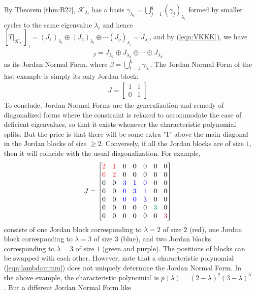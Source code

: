 By Theorem \ref{thm:B27}, $\mathcal{K}_{\lambda_i}$ has a basis $\gamma_{\lambda_i} = \bigcup_{j=1}^{q} (\gamma_j)_{\lambda_i}$ formed by smaller cycles to the same eigenvalue $\lambda_i$ and hence $[T|_{\mathcal{K}_{\lambda_i}}]_\gamma = {(J_1)}_{\lambda_i} \oplus {(J_2)}_{\lambda_i} \oplus \cdots {(J_q)}_{\lambda_i} = J_{\lambda_i}$, and by (\ref{eqn:VKKK}), we have
\begin{align}
[T]_\beta = J_{\lambda_1} \oplus J_{\lambda_2} \oplus \cdots \oplus J_{\lambda_k}
\end{align}
as its Jordan Normal Form, where $\beta = \bigcup_{i=1}^{k} \gamma_{\lambda_i}$. The Jordan Normal Form of the last example is simply its only Jordan block:
\begin{align*}
J = \begin{bmatrix}
1 & 1 \\
0 & 1
\end{bmatrix} 
\end{align*}
To conclude, Jordan Normal Forms are the generalization and remedy of diagonalized forms where the constraint is relaxed to accommodate the case of deficient eigenvalues, so that it exists whenever the characteristic polynomial splits. But the price is that there will be some extra "1" above the main diagonal in the Jordan blocks of size $\geq 2$. Conversely, if all the Jordan blocks are of size $1$, then it will coincide with the usual diagonalization. For example,
\begin{align*}
J = 
\begin{bmatrix}
\mathcolor{red}{2} & \mathcolor{red}{1} & 0 & 0 & 0 & 0 & 0 \\
\mathcolor{red}{0} & \mathcolor{red}{2} & 0 & 0 & 0 & 0 & 0 \\
0 & 0 & \mathcolor{blue}{3} & \mathcolor{blue}{1} & \mathcolor{blue}{0} & 0 & 0 \\
0 & 0 & \mathcolor{blue}{0} & \mathcolor{blue}{3} & \mathcolor{blue}{1} & 0 & 0 \\
0 & 0 & \mathcolor{blue}{0} & \mathcolor{blue}{0} & \mathcolor{blue}{3} & 0 & 0 \\
0 & 0 & 0 & 0 & 0 & \mathcolor{Green}{3} & 0 \\
0 & 0 & 0 & 0 & 0 & 0 & \mathcolor{purple}{3}
\end{bmatrix}
\end{align*}
consists of one Jordan block corresponding to $\lambda = 2$ of size $2$ (red), one Jordan block corresponding to $\lambda = 3$ of size $3$ (blue), and two Jordan blocks corresponding to $\lambda = 3$ of size $1$ (green and purple). The positions of blocks can be swapped with each other. However, note that a characteristic polynomial (\ref{eqn:lambdammm}) does not uniquely determine the Jordan Normal Form. In the above example, the characteristic polynomial is $p(\lambda) = (2-\lambda)^2(3-\lambda)^5$. But a different Jordan Normal Form like
